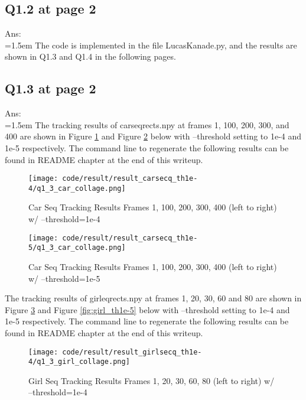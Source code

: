 \documentclass{article}
\begin{document}
	\newpage
	\subsection*{Q1.2 at page 2}
	Ans:\\
	\hangindent=1.5em \hspace{1.5em} The code is implemented in the file LucasKanade.py, and the results are shown in Q1.3 and Q1.4 in the following pages.
	
	\newpage
	\subsection*{Q1.3 at page 2}
	Ans:\\
	\hangindent=1.5em \hspace{1.5em} The tracking results of carseqrects.npy at frames 1, 100, 200, 300, and 400 are shown in Figure \ref{fig:car_th1e-4} and Figure \ref{fig:car_th1e-5} below with --threshold setting to 1e-4 and 1e-5 respectively. The command line to regenerate the following results can be found in README chapter at the end of this writeup.
	
	\begin{figure}[H]		
	\centering
	\texttt{[image: code/result/result\_carsecq\_th1e-4/q1\_3\_car\_collage.png]}  %
	\caption{Car Seq Tracking Results Frames 1, 100, 200, 300, 400 (left to right) w/ --threshold=1e-4}
	\label{fig:car_th1e-4}
	\end{figure}
	
	\begin{figure}[H]		
	\centering
	\texttt{[image: code/result/result\_carsecq\_th1e-5/q1\_3\_car\_collage.png]}  %
	\caption{Car Seq Tracking Results Frames 1, 100, 200, 300, 400 (left to right) w/ --threshold=1e-5}
	\label{fig:car_th1e-5}
	\end{figure}
	
	 The tracking results of girleqrects.npy at frames 1, 20, 30, 60 and 80 are shown in Figure \ref{fig:girl_th1e-4} and Figure \ref{fig:girl_th1e-5} below with --threshold setting to 1e-4 and 1e-5 respectively. The command line to regenerate the following results can be found in README chapter at the end of this writeup.
	 
	\begin{figure}[H]		
	\centering
	\texttt{[image: code/result/result\_girlsecq\_th1e-4/q1\_3\_girl\_collage.png]}  %
	\caption{Girl Seq Tracking Results Frames 1, 20, 30, 60, 80 (left to right) w/ --threshold=1e-4}
	\label{fig:girl_th1e-4}
	\end{figure}
\end{document}
